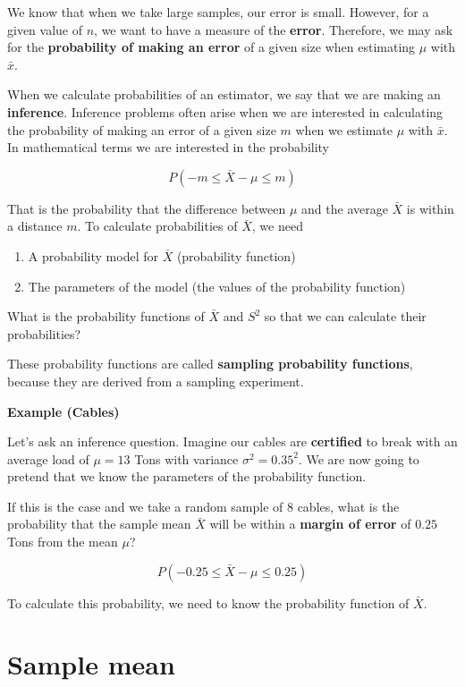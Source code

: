 \documentclass[
]{book}
\begin{document}
We know that when we take large samples, our error is small. However, for a given value of \(n\), we want to have a measure of the \textbf{error}. Therefore, we may ask for the \textbf{probability of making an error} of a given size when estimating \(\mu\) with \(\bar{x}\).

When we calculate probabilities of an estimator, we say that we are making an \textbf{inference}. Inference problems often arise when we are interested in calculating the probability of making an error of a given size \(m\) when we estimate \(\mu\) with \(\bar{x}\). In mathematical terms we are interested in the probability

\[P(-m\leq \bar{X}-\mu \leq m)\]

That is the probability that the difference between \(\mu\) and the average \(\bar{X}\) is within a distance \(m\). To calculate probabilities of \(\bar{X}\), we need

\begin{enumerate}
\def\labelenumi{\arabic{enumi}.}
\item
  A probability model for \(\bar{X}\) (probability function)
\item
  The parameters of the model (the values of the probability function)
\end{enumerate}

What is the probability functions of \(\bar{X}\) and \(S^2\) so that we can calculate their probabilities?

These probability functions are called \textbf{sampling probability functions}, because they are derived from a sampling experiment.

\textbf{Example (Cables)}

Let's ask an inference question. Imagine our cables are \textbf{certified} to break with an average load of \(\mu = 13\) Tons with variance \(\sigma^2=0.35^2\). We are now going to pretend that we know the parameters of the probability function.

If this is the case and we take a random sample of \(8\) cables, what is the probability that the sample mean \(\bar{X}\) will be within a \textbf{margin of error} of \(0.25\) Tons from the mean \(\mu\)?

\[P(- 0.25\leq \bar{X}-\mu \leq 0.25)\]

To calculate this probability, we need to know the probability function of \(\bar{X}\).

\hypertarget{sample-mean}{%
\section{Sample mean}\label{sample-mean}}
\end{document}
